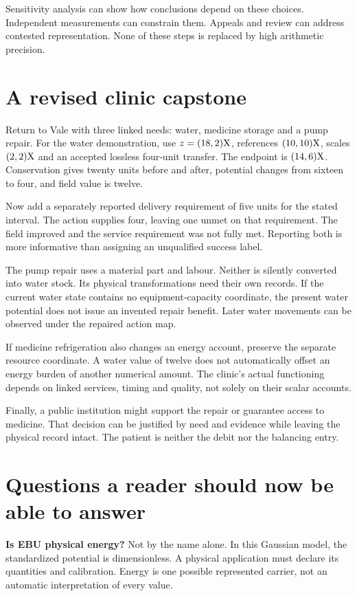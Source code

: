 Sensitivity analysis can show how conclusions depend on these choices. Independent measurements can constrain them. Appeals and review can address contested representation. None of these steps is replaced by high arithmetic precision.

\section{A revised clinic capstone}
Return to Vale with three linked needs: water, medicine storage and a pump repair. For the water demonstration, use $z=(18,2)\mathrm{X}$, references $(10,10)\mathrm{X}$, scales $(2,2)\mathrm{X}$ and an accepted lossless four-unit transfer. The endpoint is $(14,6)\mathrm{X}$. Conservation gives twenty units before and after, potential changes from sixteen to four, and field value is twelve.

Now add a separately reported delivery requirement of five units for the stated interval. The action supplies four, leaving one unmet on that requirement. The field improved and the service requirement was not fully met. Reporting both is more informative than assigning an unqualified success label.

The pump repair uses a material part and labour. Neither is silently converted into water stock. Its physical transformations need their own records. If the current water state contains no equipment-capacity coordinate, the present water potential does not issue an invented repair benefit. Later water movements can be observed under the repaired action map.

If medicine refrigeration also changes an energy account, preserve the separate resource coordinate. A water value of twelve does not automatically offset an energy burden of another numerical amount. The clinic's actual functioning depends on linked services, timing and quality, not solely on their scalar accounts.

Finally, a public institution might support the repair or guarantee access to medicine. That decision can be justified by need and evidence while leaving the physical record intact. The patient is neither the debit nor the balancing entry.

\section{Questions a reader should now be able to answer}
\textbf{Is EBU physical energy?} Not by the name alone. In this Gaussian model, the standardized potential is dimensionless. A physical application must declare its quantities and calibration. Energy is one possible represented carrier, not an automatic interpretation of every value.

